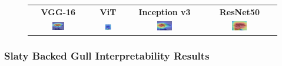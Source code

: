 \documentclass[a4paper,12pt]{report}
\begin{document}
\begin{figure}[H]
    \centering
    \setlength{\tabcolsep}{1pt}
    \begin{tabular}{cccc}
    \textbf{VGG-16} & \textbf{ViT} & \textbf{Inception v3} & \textbf{ResNet50} \\
    
    \includegraphics[width=0.22\textwidth]{images/appendix/modelgraph/vgg/correct/Glaucous_Winged_Gull/3O4A8774 - Version 2.JPG} &
    \includegraphics[width=0.22\textwidth]{images/appendix/modelgraph/vit/correct/Glaucous_Winged_Gull/3O4A8774 - Version 2.JPG} &
    \includegraphics[width=0.22\textwidth]{images/appendix/modelgraph/inception/correct/Glaucous_Winged_Gull/3O4A8774 - Version 2.JPG} &
    \includegraphics[width=0.22\textwidth]{images/appendix/modelgraph/resnet/correct/Glaucous_Winged_Gull/3O4A8774 - Version 2.JPG} \\
    \end{tabular}

    \label{fig:interpretability_glaucous_6}
\end{figure}

\clearpage
\subsubsection{Slaty Backed Gull Interpretability Results}
\label{subsec:slaty_interpretability}
\end{document}
